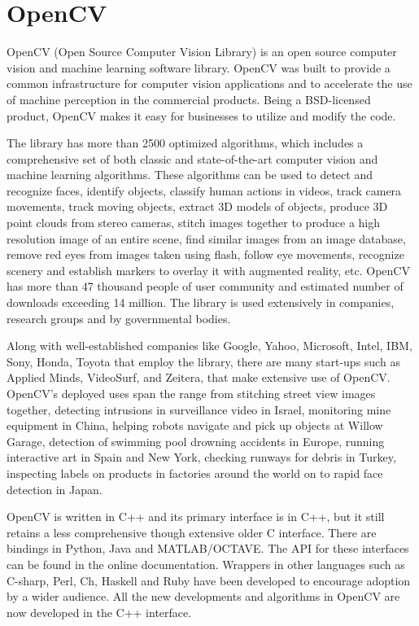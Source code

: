 \section{OpenCV}
OpenCV (Open Source Computer Vision Library) is an open source computer vision and machine learning software library. OpenCV was built to provide a common infrastructure for computer vision applications and to accelerate the use of machine perception in the commercial products. Being a BSD-licensed product, OpenCV makes it easy for businesses to utilize and modify the code.\par
The library has more than 2500 optimized algorithms, which includes a comprehensive set of both classic and state-of-the-art computer vision and machine learning algorithms. These algorithms can be used to detect and recognize faces, identify objects, classify human actions in videos, track camera movements, track moving objects, extract 3D models of objects, produce 3D point clouds from stereo cameras, stitch images together to produce a high resolution image of an entire scene, find similar images from an image database, remove red eyes from images taken using flash, follow eye movements, recognize scenery and establish markers to overlay it with augmented reality, etc. OpenCV has more than 47 thousand people of user community and estimated number of downloads exceeding 14 million. The library is used extensively in companies, research groups and by governmental bodies.\par
Along with well-established companies like Google, Yahoo, Microsoft, Intel, IBM, Sony, Honda, Toyota that employ the library, there are many start-ups such as Applied Minds, VideoSurf, and Zeitera, that make extensive use of OpenCV. OpenCV’s deployed uses span the range from stitching street view images together, detecting intrusions in surveillance video in Israel, monitoring mine equipment in China, helping robots navigate and pick up objects at Willow Garage, detection of swimming pool drowning accidents in Europe, running interactive art in Spain and New York, checking runways for debris in Turkey, inspecting labels on products in factories around the world on to rapid face detection in Japan.\par
OpenCV is written in C++ and its primary interface is in C++, but it still retains a less comprehensive though extensive older C interface. There are bindings in Python, Java and MATLAB/OCTAVE. The API for these interfaces	can be found in the online documentation. Wrappers in other languages such as C-sharp, Perl, Ch, Haskell and Ruby have been developed to encourage adoption by a wider audience. All the new developments and algorithms in OpenCV are now developed in the C++ interface.\\
